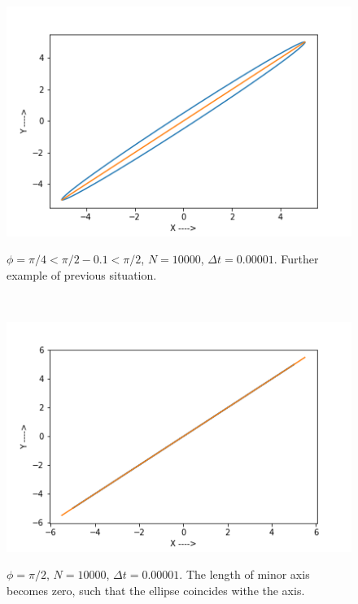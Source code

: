 \documentclass{report}
\begin{document}
\begin{figure}[H]
	\centering
	\includegraphics[width = \textwidth]{phiE.png}
	\label{phiE}
	\caption{$\phi=\pi/4<\pi/2-0.1<\pi/2$, $N=10000$, $\Delta t=0.00001$. Further example of previous situation.}
\end{figure}\

\begin{figure}[H]
	\centering
	\includegraphics[width = \textwidth]{phiF.png}
	\label{phiF}
	\caption{$\phi=\pi/2$, $N=10000$, $\Delta t=0.00001$. The length of minor axis becomes zero, such that the ellipse coincides withe the axis.}
\end{figure}
\end{document}
